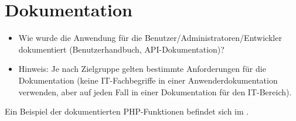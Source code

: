 \section{Dokumentation}
\label{sec:Dokumentation}

\begin{itemize}
	\item Wie wurde die Anwendung für die Benutzer/Administratoren/Entwickler dokumentiert (\zB Benutzerhandbuch, \acs{API}-Dokumentation)?
	\item Hinweis: Je nach Zielgruppe gelten bestimmte Anforderungen für die Dokumentation (\zB keine IT-Fachbegriffe in einer Anwenderdokumentation verwenden, aber auf jeden Fall in einer Dokumentation für den IT-Bereich).
\end{itemize}

Ein Beispiel der dokumentierten PHP-Funktionen befindet sich im .
